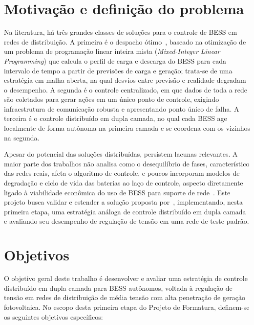 \section{Motivação e definição do problema}
\label{sec:motivacao}

Na literatura, há três grandes classes de soluções para o controle de BESS em redes de distribuição. A 
primeira é o despacho ótimo~\cite{chreim2024,li2022}, baseado na otimização de um problema de programação 
linear inteira mista (\emph{Mixed-Integer Linear Programming}) que calcula o perfil de carga e descarga 
do BESS para cada intervalo de tempo a partir de previsões de carga e geração; trata-se de uma estratégia 
em malha aberta, na qual desvios entre previsão e realidade degradam o desempenho. A segunda é o controle 
centralizado, em que dados de toda a rede são coletados para gerar ações em um único ponto de controle, 
exigindo infraestrutura de comunicação robusta e apresentando ponto único de falha. A terceira é o 
controle distribuído em dupla camada, no qual cada BESS age localmente de forma autônoma na primeira 
camada e se coordena com os vizinhos na segunda.

Apesar do potencial das soluções distribuídas, persistem lacunas relevantes. A maior parte dos trabalhos 
não analisa como o desequilíbrio de fases, característico das redes reais, afeta o algoritmo de controle, 
e poucos incorporam modelos de degradação e ciclo de vida das baterias ao laço de controle, aspecto 
diretamente ligado à viabilidade econômica do uso de BESS para suporte de rede~\cite{gangwar2024}. Este 
projeto busca validar e estender a solução proposta por~\cite{paradacontzen2024}, implementando, nesta 
primeira etapa, uma estratégia análoga de controle distribuído em dupla camada e avaliando seu desempenho 
de regulação de tensão em uma rede de teste padrão.

\section{Objetivos}
\label{sec:objetivos}

O objetivo geral deste trabalho é desenvolver e avaliar uma estratégia de controle distribuído em dupla 
camada para BESS autônomos, voltada à regulação de tensão em redes de distribuição de média tensão com 
alta penetração de geração fotovoltaica. No escopo desta primeira etapa do Projeto de Formatura, 
definem-se os seguintes objetivos específicos:

